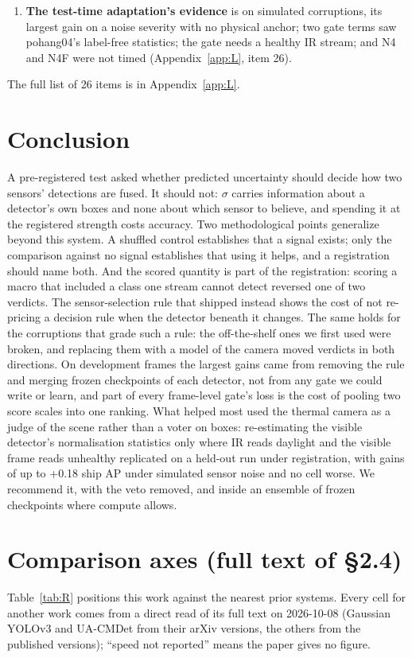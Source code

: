 \documentclass[10pt]{article}
\begin{document}
\begin{enumerate}
\item \textbf{The test-time adaptation's evidence} is on simulated corruptions, its largest gain on a noise severity with no physical anchor; two gate terms saw pohang04's label-free statistics; the gate needs a healthy IR stream; and N4 and N4F were not timed (Appendix~\ref{app:L}, item 26).
\end{enumerate}

The full list of 26 items is in Appendix~\ref{app:L}.

\section{Conclusion}\label{sec:10}
A pre-registered test asked whether predicted uncertainty should decide how two sensors' detections are fused. It should not: $\sigma$ carries information about a detector's own boxes and none about which sensor to believe, and spending it at the registered strength costs accuracy. Two methodological points generalize beyond this system. A shuffled control establishes that a signal exists; only the comparison against no signal establishes that using it helps, and a registration should name both. And the scored quantity is part of the registration: scoring a macro that included a class one stream cannot detect reversed one of two verdicts. The sensor-selection rule that shipped instead shows the cost of not re-pricing a decision rule when the detector beneath it changes. The same holds for the corruptions that grade such a rule: the off-the-shelf ones we first used were broken, and replacing them with a model of the camera moved verdicts in both directions. On development frames the largest gains came from removing the rule and merging frozen checkpoints of each detector, not from any gate we could write or learn, and part of every frame-level gate's loss is the cost of pooling two score scales into one ranking. What helped most used the thermal camera as a judge of the scene rather than a voter on boxes: re-estimating the visible detector's normalisation statistics only where IR reads daylight and the visible frame reads unhealthy replicated on a held-out run under registration, with gains of up to +0.18 ship AP under simulated sensor noise and no cell worse. We recommend it, with the veto removed, and inside an ensemble of frozen checkpoints where compute allows.

\FloatBarrier



\appendix
\FloatBarrier
\section{Comparison axes (full text of \S2.4)}\label{app:A}
Table~\ref{tab:R} positions this work against the nearest prior systems. Every cell for another work comes from a direct read of its full text on 2026-10-08 (Gaussian YOLOv3 and UA-CMDet from their arXiv versions, the others from the published versions); ``speed not reported'' means the paper gives no figure.
\end{document}
